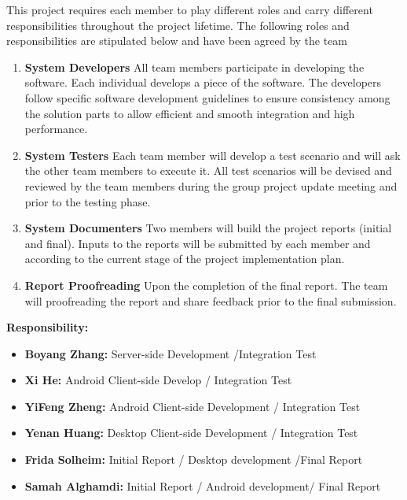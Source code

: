 \documentclass{article}
\begin{document}
This project requires each member to play different roles and carry different responsibilities throughout the project lifetime. The following roles and responsibilities are stipulated below and have been agreed by the team

\begin{enumerate}

  \item \textbf{System Developers} All team members participate in developing the software. Each individual develops a piece of the software. The developers follow specific software development guidelines to ensure consistency among the solution parts to allow efficient and smooth integration and high performance.
  \item \textbf{System Testers} Each team member will develop a test scenario and will ask the other team members to execute it. All test scenarios will be devised and reviewed by the team members during the group project update meeting and prior to the testing phase.
  \item \textbf{System Documenters} Two members will build the project reports (initial and final). Inputs to the reports will be submitted by each member and according to the current stage of the project implementation plan.
  \item \textbf{Report Proofreading} Upon the completion of the final report. The team will proofreading the report and share feedback prior to the final submission.

\end{enumerate}

\textbf{Responsibility:}

\begin{itemize}
  \item \textbf{Boyang Zhang:} Server-side Development /Integration Test
  \item \textbf{Xi He:} Android Client-side Develop / Integration Test
  \item \textbf{YiFeng Zheng:} Android Client-side Development / Integration Test
  \item \textbf{Yenan Huang:} Desktop Client-side Development / Integration Test
  \item \textbf{Frida Solheim:} Initial Report / Desktop development /Final Report
  \item \textbf{Samah Alghamdi:} Initial Report / Android development/ Final Report
\end{itemize}
\end{document}
